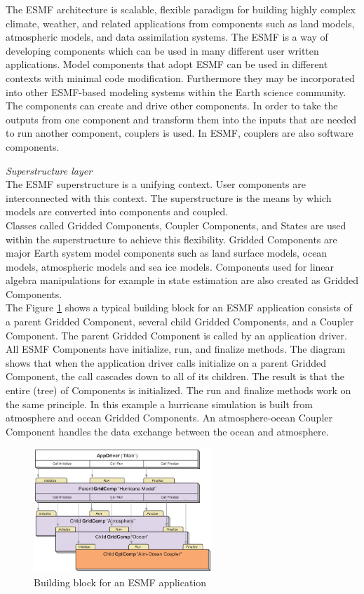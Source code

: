 The ESMF architecture is scalable, flexible paradigm for building highly complex climate, weather, and related applications from components such as land models, atmospheric models, and data assimilation systems. The ESMF is a way of developing components which can be used in many different user written applications. Model components that adopt ESMF can be used in different contexts with minimal code modification. Furthermore they may be incorporated into other ESMF-based modeling systems within the Earth science community. The components can create and drive other components. In order to take the outputs from one component and transform them into the inputs that are needed to run another component, couplers is used. In ESMF, couplers are also software components.

\emph{Superstructure layer}\\
The ESMF superstructure is a unifying context. User components are interconnected with this context. The superstructure is the means by which models are converted into components and coupled.\\
Classes called Gridded Components, Coupler Components, and States are used within the superstructure to achieve this flexibility. Gridded Components are major Earth system model components such as land surface models, ocean models, atmospheric models and sea ice models. Components used for linear algebra manipulations for example in state estimation are also created as Gridded Components.\\

The Figure \ref{fig:Building block for an ESMF application} shows a typical building block for an ESMF application consists of 
a parent Gridded Component, several child Gridded Components, and a Coupler Component. The parent Gridded Component is called by an application driver. All ESMF Components have initialize, run, and finalize methods. The diagram shows that when the application driver calls initialize on a parent Gridded Component, the call cascades down to all of its children. The result is that the entire (tree) of Components is initialized. The run and finalize methods work on the same principle. In this example a hurricane simulation is built from atmosphere and ocean Gridded Components. An atmosphere-ocean Coupler Component handles the data exchange between the ocean and atmosphere.

\begin{figure}[htbp]
\centering
\includegraphics[width=0.6\textwidth]{pics/esmf/Figure2.png}
\caption{Building block for an ESMF application}
\label{fig:Building block for an ESMF application}
\end{figure}

